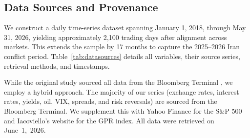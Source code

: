 \documentclass[12pt]{article}
\begin{document}
\subsection{Data Sources and Provenance}

{} We construct a daily time-series dataset spanning January 1, 2018, through May 31, 2026, yielding approximately 2,100 trading days after alignment across markets. This extends the \textcite{guyot2026risk} sample by 17 months to capture the 2025--2026 Iran conflict period. Table~\ref{tab:datasources} details all variables, their source series, retrieval methods, and timestamps.

{} While the original study sourced all data from the Bloomberg Terminal \parencite{guyot2026risk}, we employ a hybrid approach. The majority of our series (exchange rates, interest rates, yields, oil, VIX, spreads, and risk reversals) are sourced from the Bloomberg Terminal. We supplement this with Yahoo Finance for the S\&P 500 and Iacoviello's website for the GPR index. All data were retrieved on June~1,~2026.
\end{document}
